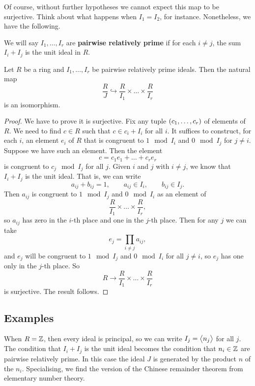 Of course, without further hypotheses we cannot expect this map to be surjective. Think about what happens when $ I_1 = I_2 $, for instance. Nonetheless, we have the following.

\begin{definition}
We will say $ I_1, \dots, I_r $ are \textbf{pairwise relatively prime} if for each $ i \ne j $, the sum $ I_i + I_j $ is the unit ideal in $ R $.
\end{definition}

\begin{theorem}
Let $ R $ be a ring and $ I_1, \dots, I_r $ be pairwise relatively prime ideals. Then the natural map
$$ \dfrac{R}{J} \hookrightarrow \dfrac{R}{I_1} \times \dots \times \dfrac{R}{I_r} $$
is an isomorphism.
\end{theorem}

\begin{proof}
We have to prove it is surjective. Fix any tuple $ \br{c_1, \dots, c_r} $ of elements of $ R $. We need to find $ c \in R $ such that $ c \in c_i + I_i $ for all $ i $. It suffices to construct, for each $ i $, an element $ e_i $ of $ R $ that is congruent to $ 1 \mod I_i $ and $ 0 \mod I_j $ for $ j \ne i $. Suppose we have such an element. Then the element
$$ c = c_1e_1 + \dots + c_re_r $$
is congruent to $ c_j \mod I_j $ for all $ j $. Given $ i $ and $ j $ with $ i \ne j $, we know that $ I_i + I_j $ is the unit ideal. That is, we can write
$$ a_{ij} + b_{ij} = 1, \qquad a_{ij} \in I_i, \qquad b_{ij} \in I_j. $$
Then $ a_{ij} $ is congruent to $ 1 \mod I_j $ and $ 0 \mod I_i $ as an element of
$$ \dfrac{R}{I_1} \times \dots \times \dfrac{R}{I_r}, $$
so $ a_{ij} $ has zero in the $ i $-th place and one in the $ j $-th place. Then for any $ j $ we can take
$$ e_j = \prod_{i \ne j} a_{ij}, $$
and $ e_j $ will be congruent to $ 1 \mod I_j $ and $ 0 \mod I_i $ for all $ j \ne i $, so $ e_j $ has one only in the $ j $-th place. So
$$ R \to \dfrac{R}{I_1} \times \dots \times \dfrac{R}{I_r} $$
is surjective. The result follows.
\end{proof}

\pagebreak

\subsection{Examples}

When $ R = \mathbb{Z} $, then every ideal is principal, so we can write $ I_j = \left\langle n_j \right\rangle $ for all $ j $. The condition that $ I_i + I_j $ is the unit ideal becomes the condition that $ n_i \in \mathbb{Z} $ are pairwise relatively prime. In this case the ideal $ J $ is generated by the product $ n $ of the $ n_i $. Specialising, we find the version of the Chinese remainder theorem from elementary number theory.

